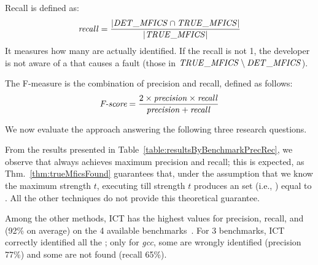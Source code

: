 \begin{tikzborder}{\cite{Gargantini16:validation}}
\begin{tikzborder}{\cite{gargantini_combinatorial_2017}}
\begin{tikzborder}{\cite{gargantini_combinatorial_2017}}
\begin{tikzborder}{\cite{garn2019}}
\begin{tikzborder}{\cite{arcaini2019achieving}}
\begin{tikzborder}{}
Recall is defined as:
%
\[\mathit{recall} = \frac{|\mathit{DET\_MFICS} \cap \mathit{TRUE\_MFICS}|}{|\mathit{TRUE\_MFICS}|}\]
%
It measures how many \truemfics are actually identified. If the recall is not 1, the developer is not aware of a \truemfic that causes a fault (those in $\mathit{TRUE\_MFICS} \setminus \mathit{DET\_MFICS}$).

The F-measure is the combination of precision and recall, defined as follows:
%
\[\textnormal{\it F-score} = \frac{2 \times \mathit{precision} \times \mathit{recall}}{\mathit{precision} + \mathit{recall}}\]

We now evaluate the approach answering the following three research questions.


From the results presented in Table~\ref{table:resultsByBenchmarkPrecRec}, we observe that \mix always achieves maximum precision and recall; this is expected, as Thm.~\ref{thm:trueMficsFound} guarantees that, under the assumption that we know the maximum strength $t$, executing \mix till strength $t$ produces an \isoMficsSet set (i.e., \detMficsSet) equal to \trueMficsSet. All the other techniques do not provide this theoretical guarantee.

Among the other methods, ICT has the highest values for precision, recall, and \fScore (92\% on average) on the 4 available benchmarks~\cite{Niu2018interleaving}. For 3 benchmarks, ICT correctly identified all the \trueMficsSet; only for \textit{gcc}, some are wrongly identified (precision 77\%) and some are not found (recall 65\%).


\end{tikzborder}
\end{tikzborder}
\end{tikzborder}
\end{tikzborder}
\end{tikzborder}
\end{tikzborder}
